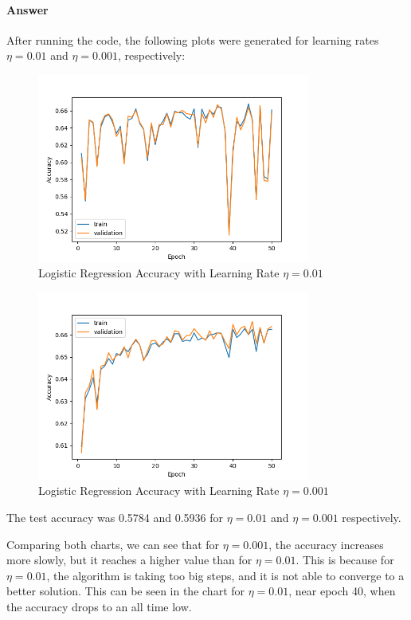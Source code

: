 \documentclass{article}
\begin{document}
\paragraph{Answer} After running the code, the following plots were generated for learning rates $\eta = 0.01$ and $\eta = 0.001$, respectively:
\begin{figure}[H]
    \centering
    \includegraphics[width=0.8\textwidth]{"plots/1_1_b_001.png"}
    \caption{Logistic Regression Accuracy with Learning Rate $\eta = 0.01$}
    \label{1.1.b 0.01 Plot}
\end{figure}

\begin{figure}[H]
    \centering
    \includegraphics[width=0.8\textwidth]{"plots/1_1_b_0001.png"}
    \caption{Logistic Regression Accuracy with Learning Rate $\eta= 0.001$}
    \label{1.1.b 0.0001 Plot}
\end{figure}

The test accuracy was 0.5784 and 0.5936 for $\eta = 0.01$ and $\eta = 0.001$ respectively.

Comparing both charts, we can see that for $\eta = 0.001$, the accuracy increases more slowly, but it reaches a higher value than for $\eta = 0.01$. 
This is because for $\eta = 0.01$, the algorithm is taking too big steps, and it is not able to converge to a better solution. This can be 
seen in the chart for $\eta = 0.01$, near epoch 40, when the accuracy drops to an all time low.
\end{document}
